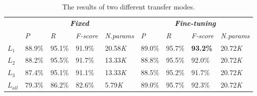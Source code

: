 \documentclass{article}
\begin{document}
	
\begin{table}[b]\footnotesize
	\setlength{\abovecaptionskip}{0.1cm}   %
	\setlength{\belowcaptionskip}{0cm}   %
	\renewcommand\tabcolsep{0.5pt} 
	\centering
	\caption{The results of two different transfer modes.}
	\begin{tabular}{p{3.0cm}<{\centering}
			|p{1.3cm}<{\centering}
			|p{1.3cm}<{\centering}
			|p{1.3cm}<{\centering}
			|p{1.5cm}<{\centering}
			|p{1.3cm}<{\centering}
			|p{1.3cm}<{\centering}
			|p{1.3cm}<{\centering}
			|p{1.5cm}<{\centering}}
		\hline
		\multirow{2}{*}{\makecell[c]{\textbf{\textsl{Transferred layer}}}}  & \multicolumn{4}{c|}{\textbf{\textsl{{Fixed}}}} & \multicolumn{4}{c}{\textbf{\textsl{Fine-tuning}}}  \\
		\cline{2-9}
		& \textsl{P} & \textsl{R} & \textsl{F-score} & \textsl{N.params} & \textsl{P} & \textsl{R} & \textsl{F-score} & \textsl{N.params} \\
		\hline 		
		\textsl{$L_1$} & 88.9\% & 95.1\% & 91.9\% & 20.58\textsl{K} & 89.0\% & 95.7\%  & \textbf{93.2\%} & 20.72\textsl{K} \\
		\textsl{$L_2$}  & 88.2\% & 95.5\% & 91.7\% & 13.33\textsl{K}  & 88.8\% & 95.5\% & 92.0\% & 20.72\textsl{K} \\
		\textsl{$L_3$} & 87.4\% & 95.1\%  & 91.1\% & 13.33\textsl{K}  & 88.5\% & 95.2\% & 91.7\% & 20.72\textsl{K} \\
		\textsl{$L_{all}$} & 79.3\% & 86.2\%  & 82.6\% & 5.79\textsl{K} & 89.0\% & 95.7\% & 92.3\% & 20.72\textsl{K} \\
		\hline
	\end{tabular}
	\label{tab:two_modes}
\end{table}  
\end{document}
